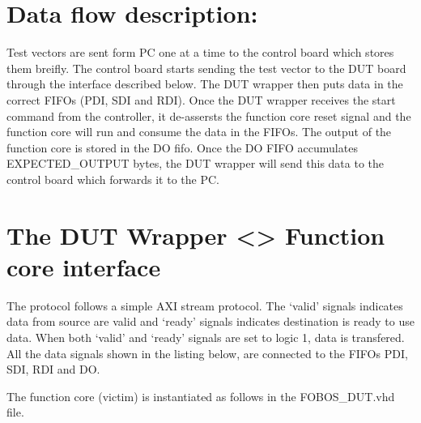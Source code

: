 \documentclass[letterpaper,10pt,english]{sphinxmanual}
\begin{document}
\section{Data flow description:}
\label{\detokenize{dutdev:data-flow-description}}
Test vectors are sent form PC one at a time to the control board which stores them breifly.
The control board starts sending the test vector to the DUT board through the interface described below.
The DUT wrapper then puts data in the correct FIFOs (PDI, SDI and RDI).
Once the DUT wrapper receives the start command from the controller, it de-assersts the function core reset signal and the function core will run and consume the data in the FIFOs.
The output of the function core is stored in the DO fifo.
Once the DO FIFO accumulates EXPECTED\_OUTPUT bytes, the DUT wrapper will send this data to the control board which forwards it to the PC.


\section{The DUT Wrapper \textless{}\textendash{}\textgreater{} Function core interface}
\label{\detokenize{dutdev:the-dut-wrapper-function-core-interface}}
The protocol follows a simple AXI stream protocol. The ‘valid’ signals indicates data from source are valid and ‘ready’ signals
indicates destination is ready to use data. When both ‘valid’ and ‘ready’ signals are set to logic 1, data is transfered.
All the data signals shown in the listing below, are connected to the FIFOs PDI, SDI, RDI and DO.

The function core (victim) is instantiated as follows in the FOBOS\_DUT.vhd file.
\end{document}
